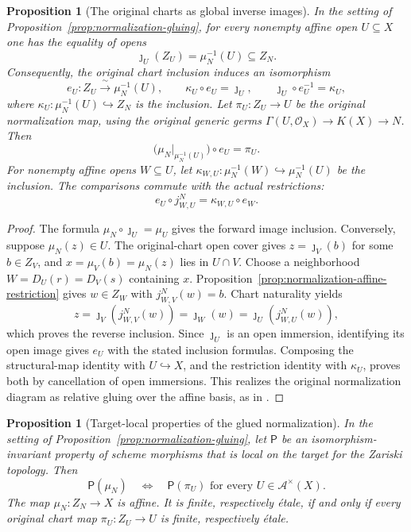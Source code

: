 \documentclass[11pt]{article}
\newtheorem{proposition}[theorem]{Proposition}
\theoremstyle{definition}
\theoremstyle{remark}
\begin{document}
\begin{proposition}[The original charts as global inverse images]
\label{prop:normalization-global-chart}
In the setting of Proposition~\ref{prop:normalization-gluing}, for every
nonempty affine open \(U\subseteq X\) one has the equality of opens
\[
 \jmath_U(Z_U)=\mu_N^{-1}(U)\subseteq Z_N.
\]
Consequently, the original chart inclusion induces an isomorphism
\[
 e_U:Z_U\xrightarrow{\ \sim\ }\mu_N^{-1}(U),
 \qquad \kappa_U\circ e_U=\jmath_U,
 \qquad \jmath_U\circ e_U^{-1}=\kappa_U,
\]
where \(\kappa_U:\mu_N^{-1}(U)\hookrightarrow Z_N\) is the inclusion.
Let \(\pi_U:Z_U\to U\) be the original normalization map, using the
original generic germs \(\Gamma(U,\mathcal O_X)\to K(X)\to N\).
Then
\[
 \bigl(\mu_N|_{\mu_N^{-1}(U)}\bigr)\circ e_U=\pi_U.
\]
For nonempty affine opens \(W\subseteq U\), let
\(\kappa_{W,U}:\mu_N^{-1}(W)\hookrightarrow\mu_N^{-1}(U)\)
be the inclusion. The comparisons commute with the actual restrictions:
\[
 e_U\circ j^N_{W,U}=\kappa_{W,U}\circ e_W.
\]
\end{proposition}

\begin{proof}
The formula \(\mu_N\circ\jmath_U=\mu_U\) gives the forward image
inclusion. Conversely, suppose \(\mu_N(z)\in U\). The original-chart
open cover gives \(z=\jmath_V(b)\) for some \(b\in Z_V\), and
\(x=\mu_V(b)=\mu_N(z)\) lies in \(U\cap V\). Choose a neighborhood
\(W=D_U(r)=D_V(s)\) containing \(x\).
Proposition~\ref{prop:normalization-affine-restriction} gives
\(w\in Z_W\) with \(j^N_{W,V}(w)=b\). Chart naturality yields
\[
 z=\jmath_V(j^N_{W,V}(w))
   =\jmath_W(w)=\jmath_U(j^N_{W,U}(w)),
\]
which proves the reverse inclusion.
Since \(\jmath_U\) is an open immersion, identifying its open image
gives \(e_U\) with the stated inclusion formulas. Composing the
structural-map identity with \(U\hookrightarrow X\), and the
restriction identity with \(\kappa_U\), proves both by cancellation
of open immersions. This realizes the original normalization diagram
as relative gluing over the affine basis, as in
\cite{StacksRelativeGluing}.
\end{proof}

\begin{proposition}[Target-local properties of the glued normalization]
\label{prop:normalization-target-local}
In the setting of Proposition~\ref{prop:normalization-gluing}, let
\(\mathsf P\) be an isomorphism-invariant property of scheme morphisms
that is local on the target for the Zariski topology. Then
\[
 \mathsf P(\mu_N)
 \quad\Longleftrightarrow\quad
 \mathsf P(\pi_U)\text{ for every }U\in\mathcal A^{\times}(X).
\]
The map \(\mu_N:Z_N\to X\) is affine. It is finite, respectively
\'{e}tale, if and only if every original chart map \(\pi_U:Z_U\to U\)
is finite, respectively \'{e}tale.
\end{proposition}
\end{document}
